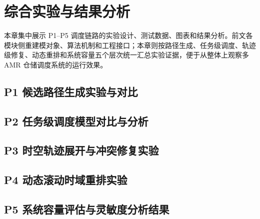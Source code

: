\section{综合实验与结果分析}

本章集中展示 P1--P5 调度链路的实验设计、测试数据、图表和结果分析。前文各模块侧重建模对象、算法机制和工程接口；本章则按路径生成、任务级调度、轨迹级修复、动态重排和系统容量五个层次统一汇总实验证据，便于从整体上观察多 AMR 仓储调度系统的运行效果。

\subsection{P1 候选路径生成实验与对比}


\subsection{P2 任务级调度模型对比与分析}


\subsection{P3 时空轨迹展开与冲突修复实验}


\subsection{P4 动态滚动时域重排实验}


\subsection{P5 系统容量评估与灵敏度分析结果}


